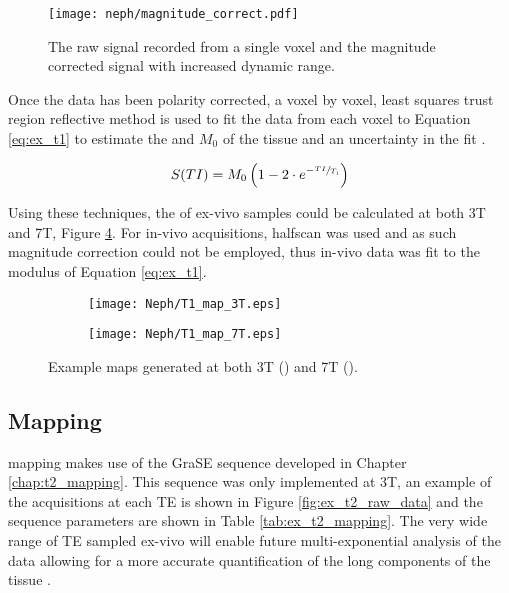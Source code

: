 \begin{figure}[H]
	\centering
	\texttt{[image: neph/magnitude\_correct.pdf]}
	\caption{The raw signal recorded from a single voxel and the magnitude corrected signal with increased dynamic range.}
	\label{fig:ex_sig_mag_correction}	
\end{figure}

Once the data has been polarity corrected, a voxel by voxel, least squares trust region reflective method is used to fit the data from each voxel to Equation \eqref{eq:ex_t1} to estimate the \tone and $M_0$ of the tissue and an uncertainty in the fit \cite{branch_subspace_1999}.

\begin{equation}
	S(TI) = M_0\left(1-2 \cdot e^{-\sfrac{TI}{T_1}}\right)
	\label{eq:ex_t1}
\end{equation}

Using these techniques, the \tone of ex-vivo samples could be calculated at both 3T and 7T, Figure \ref{fig:ex_t1_maps}. For in-vivo acquisitions, halfscan was used and as such magnitude correction could not be employed, thus in-vivo data was fit to the modulus of Equation \eqref{eq:ex_t1}.
 
\begin{figure}[H]
	\centering
	\begin{subfigure}[c]{0.47\textwidth}
		\centering
		\texttt{[image: Neph/T1\_map\_3T.eps]}
		\caption{}
		\label{fig:ex_t1_map_3t}
	\end{subfigure}
	\hfill
	\begin{subfigure}[c]{0.47\textwidth}
		\centering
		\texttt{[image: Neph/T1\_map\_7T.eps]}
		\caption{}
		\label{fig:ex_t1_map_7t}
	\end{subfigure}
	\caption{Example \tone maps generated at both 3T () and 7T ().}
	\label{fig:ex_t1_maps}
\end{figure}

\subsection{\ttwo Mapping}

\ttwo mapping makes use of the \ac{GraSE} sequence developed in Chapter \ref{chap:t2_mapping}. This sequence was only implemented at 3T, an example of the acquisitions at each \ac{TE} is shown in Figure \ref{fig:ex_t2_raw_data} and the sequence parameters are shown in Table \ref{tab:ex_t2_mapping}. The very wide range of \ac{TE} sampled ex-vivo will enable future multi-exponential analysis of the data allowing for a more accurate quantification of the long \ttwo components of the tissue \cite{bjarnason_analyzennls_2010, sabouri_mr_2017}.

